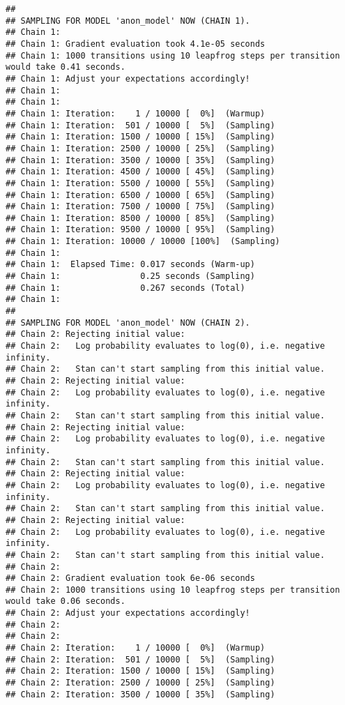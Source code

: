 \documentclass[
]{article}
\begin{document}
\begin{verbatim}
## 
## SAMPLING FOR MODEL 'anon_model' NOW (CHAIN 1).
## Chain 1: 
## Chain 1: Gradient evaluation took 4.1e-05 seconds
## Chain 1: 1000 transitions using 10 leapfrog steps per transition would take 0.41 seconds.
## Chain 1: Adjust your expectations accordingly!
## Chain 1: 
## Chain 1: 
## Chain 1: Iteration:    1 / 10000 [  0%]  (Warmup)
## Chain 1: Iteration:  501 / 10000 [  5%]  (Sampling)
## Chain 1: Iteration: 1500 / 10000 [ 15%]  (Sampling)
## Chain 1: Iteration: 2500 / 10000 [ 25%]  (Sampling)
## Chain 1: Iteration: 3500 / 10000 [ 35%]  (Sampling)
## Chain 1: Iteration: 4500 / 10000 [ 45%]  (Sampling)
## Chain 1: Iteration: 5500 / 10000 [ 55%]  (Sampling)
## Chain 1: Iteration: 6500 / 10000 [ 65%]  (Sampling)
## Chain 1: Iteration: 7500 / 10000 [ 75%]  (Sampling)
## Chain 1: Iteration: 8500 / 10000 [ 85%]  (Sampling)
## Chain 1: Iteration: 9500 / 10000 [ 95%]  (Sampling)
## Chain 1: Iteration: 10000 / 10000 [100%]  (Sampling)
## Chain 1: 
## Chain 1:  Elapsed Time: 0.017 seconds (Warm-up)
## Chain 1:                0.25 seconds (Sampling)
## Chain 1:                0.267 seconds (Total)
## Chain 1: 
## 
## SAMPLING FOR MODEL 'anon_model' NOW (CHAIN 2).
## Chain 2: Rejecting initial value:
## Chain 2:   Log probability evaluates to log(0), i.e. negative infinity.
## Chain 2:   Stan can't start sampling from this initial value.
## Chain 2: Rejecting initial value:
## Chain 2:   Log probability evaluates to log(0), i.e. negative infinity.
## Chain 2:   Stan can't start sampling from this initial value.
## Chain 2: Rejecting initial value:
## Chain 2:   Log probability evaluates to log(0), i.e. negative infinity.
## Chain 2:   Stan can't start sampling from this initial value.
## Chain 2: Rejecting initial value:
## Chain 2:   Log probability evaluates to log(0), i.e. negative infinity.
## Chain 2:   Stan can't start sampling from this initial value.
## Chain 2: Rejecting initial value:
## Chain 2:   Log probability evaluates to log(0), i.e. negative infinity.
## Chain 2:   Stan can't start sampling from this initial value.
## Chain 2: 
## Chain 2: Gradient evaluation took 6e-06 seconds
## Chain 2: 1000 transitions using 10 leapfrog steps per transition would take 0.06 seconds.
## Chain 2: Adjust your expectations accordingly!
## Chain 2: 
## Chain 2: 
## Chain 2: Iteration:    1 / 10000 [  0%]  (Warmup)
## Chain 2: Iteration:  501 / 10000 [  5%]  (Sampling)
## Chain 2: Iteration: 1500 / 10000 [ 15%]  (Sampling)
## Chain 2: Iteration: 2500 / 10000 [ 25%]  (Sampling)
## Chain 2: Iteration: 3500 / 10000 [ 35%]  (Sampling)

\end{verbatim}
\end{document}
